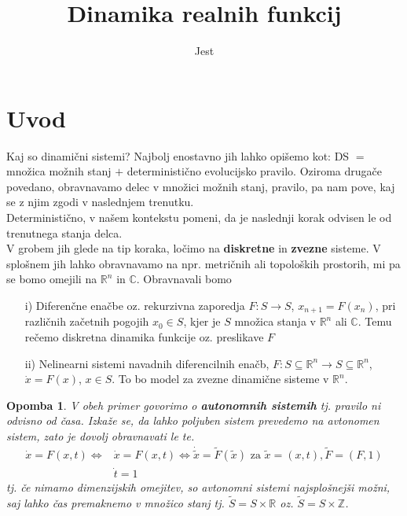 \documentclass{article}
\title{Dinamika realnih funkcij}
\author{Jest}
\newtheorem{opomba}{Opomba}
\newcommand{\C}{\mathbb{C}}
\newcommand{\Z}{\mathbb{Z}}
\newcommand{\R}{\mathbb{R}}
\begin{document}
\section{Uvod}
Kaj so dinamični sistemi? Najbolj enostavno jih lahko opišemo kot: DS $=$ množica možnih stanj $+$ deterministično evolucijsko pravilo. Oziroma drugače povedano, obravnavamo delec v množici možnih stanj, pravilo, pa nam pove, kaj se z njim zgodi v naslednjem trenutku.\\ 
Deterministično, v našem kontekstu pomeni, da je naslednji korak odvisen le od trenutnega stanja delca.\\ 
V grobem jih glede na tip koraka, ločimo na \textbf{diskretne} in \textbf{zvezne} sisteme. V splošnem jih lahko obravnavamo na npr. metričnih ali topoloških prostorih, mi pa se bomo omejili na $\R^n$ in $\C$. Obravnavali bomo
\begin{enumerate}
\item[i)] Diferenčne enačbe oz. rekurzivna zaporedja $F: S\rightarrow S$, $x_{n+1} = F(x_n)$, pri različnih začetnih pogojih $x_0 \in S$, kjer je $S$ množica stanja v $\R^n$ ali $\C$. Temu rečemo diskretna dinamika funkcije oz. preslikave $F$
\item[ii)] Nelinearni sistemi navadnih diferencilnih enačb, $F: S\subseteq \R^n \rightarrow S \subseteq \R^n$, $\dot{x} = F(x)$, $x\in S$. To bo model za zvezne dinamične sisteme v $\R^n$.
\end{enumerate}

\begin{opomba}
V obeh primer govorimo o \textbf{autonomnih sistemih} tj. pravilo ni odvisno od časa. Izkaže se, da lahko poljuben sistem prevedemo na avtonomen sistem, zato je dovolj obravnavati le te.
\begin{align*}
\dot{x} = F(x,t) \iff &\dot{x} = F(x, t) \iff \dot{\tilde{x}} = \tilde{F}(\tilde{x}) \text{ za } \tilde{x} = (x, t), \tilde{F} = (F, 1) \\ 
&\dot{t} = 1
\end{align*}
tj. če nimamo dimenzijskih omejitev, so avtonomni sistemi najsplošnejši možni, saj lahko čas premaknemo v množico stanj tj. $\tilde{S} = S \times \R$ oz. $\tilde{S} = S \times \Z$.
\end{opomba}
\end{document}
